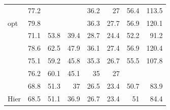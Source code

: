 \begin{table}[ht]
\begin{tabular}{lcrrrrrr}
    \citet{Anderson2018_BUTD}    &    77.2    &        &        &    36.2    &    27    &    56.4    &    113.5    \\
    \citet{Anderson2018_BUTD}  opt    &    79.8    &        &        &    36.3    &    27.7    &    56.9    &    120.1    \\
    \citet{Aneja2018}    &    71.1    &    53.8    &    39.4    &    28.7    &    24.4    &    52.2    &    91.2    \\
    \citet{Gu2018}    &    78.6    &    62.5    &    47.9    &    36.1    &    27.4    &    56.9    &    120.4    \\
    \citet{Jiang2018}    &    75.1    &    59.2    &    45.8    &    35.3    &    26.7    &    55.5    &    107.8    \\
    \citet{Khademi2018}    &    76.2    &    60.1    &    45.1    &    35    &    27    &        &        \\
    \citet{Wang2018}    &    68.8    &    51.3    &    37    &    26.5    &    23.4    &    50.7    &    83.9    \\
    \citet{Wang2018} Hier    &    68.5    &    51.1    &    36.9    &    26.7    &    23.4    &    51    &    84.4    \\
    \bottomrule
\end{tabular}
\label{tab:benchmarks_mscoco}
\end{table}



